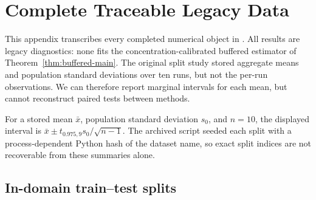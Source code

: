 \section{Complete Traceable Legacy Data}
\label{app:legacy-full-data}

This appendix transcribes every completed numerical object in .  All results are legacy diagnostics: none fits the concentration-calibrated buffered estimator of Theorem~\ref{thm:buffered-main}.  The original split study stored aggregate means and population standard deviations over ten runs, but not the per-run observations.  We can therefore report marginal intervals for each mean, but cannot reconstruct paired tests between methods.

For a stored mean \(\bar x\), population standard deviation \(s_0\), and \(n=10\), the displayed interval is \(\bar x\mathbin{\pm}t_{0.975,9}s_0/\sqrt{n-1}\).  The archived script seeded each split with a process-dependent Python hash of the dataset name, so exact split indices are not recoverable from these summaries alone.

\subsection{In-domain train--test splits}


